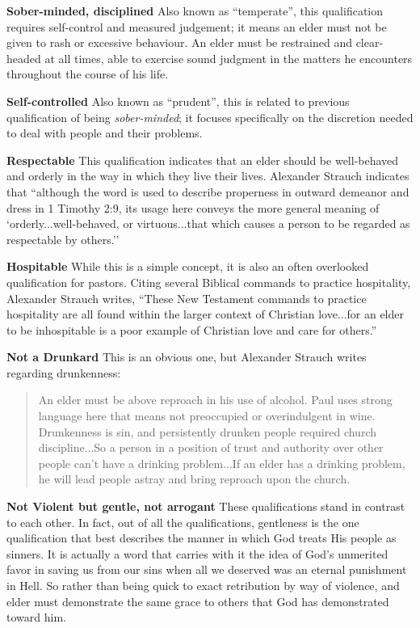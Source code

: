 \documentclass[letterpaper, 12pt]{article}
\begin{document}
    \textbf{Sober-minded, disciplined} Also known as ``temperate'', this
    qualification requires self-control and measured judgement; it
    means an elder must not be given to rash or excessive behaviour.
    An elder must be restrained and clear-headed at all times, able to
    exercise sound judgment in the matters he encounters throughout
    the course of his life.

    \textbf{Self-controlled} Also known as ``prudent'', this is
    related to previous qualification of being \emph{sober-minded}; it
    focuses specifically on the discretion needed to deal with people
    and their problems.

    \textbf{Respectable} This qualification indicates that an elder
    should be well-behaved and orderly in the way in which they live
    their lives.  Alexander Strauch indicates that ``although the word
    is used to describe properness in outward demeanor and dress in 1
    Timothy 2:9, its usage here conveys the more general meaning of
    `orderly...well-behaved, or virtuous...that which causes a person
    to be regarded as respectable by others.''

    \textbf{Hospitable} While this is a simple concept, it is also an
    often overlooked qualification for pastors.  Citing several
    Biblical commands to practice hospitality, Alexander Strauch
    writes, ``These New Testament commands to practice hospitality are
    all found within the larger context of Christian love...for an
    elder to be inhospitable is a poor example of Christian love and
    care for others.''

    \textbf{Not a Drunkard} This is an obvious one, but Alexander
    Strauch writes regarding drunkenness:
    
    \begin{quote}

        An elder must be above reproach in his use of alcohol.  Paul
        uses strong language here that means not preoccupied or
        overindulgent in wine.  Drunkenness is sin, and persistently
        drunken people required church discipline...So a person in a
        position of trust and authority over other people can't have a
        drinking problem...If an elder has a drinking problem, he will
        lead people astray and bring reproach upon the church.

    \end{quote}

    \textbf{Not Violent but gentle, not arrogant} These
    qualifications stand in contrast to each other.  In fact, out of
    all the qualifications, gentleness is the one qualification that
    best describes the manner in which God treats His people as
    sinners.  It is actually a word that carries with it the idea of
    God's unmerited favor in saving us from our sins when all we
    deserved was an eternal punishment in Hell.  So rather than
    being quick to exact retribution by way of violence, and elder
    must demonstrate the same grace to others that God has
    demonstrated toward him.
\end{document}
